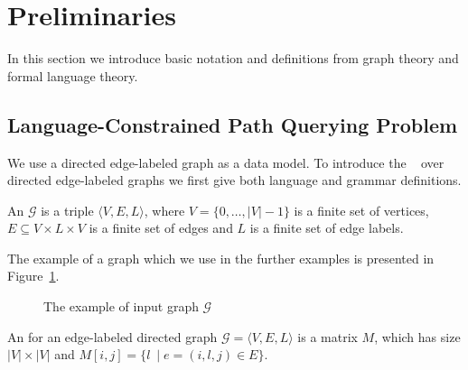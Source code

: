 \section{Preliminaries}

In this section we introduce basic notation and definitions from graph theory and formal language theory.

\subsection{Language-Constrained Path Querying Problem}

We use a directed edge-labeled graph as a data model.
To introduce the ~\cite{barrett2000formal} over directed edge-labeled graphs we first give both language and grammar definitions.

\begin{definition}
An  $\mathcal{G}$ is a triple $\langle V,E,L \rangle$, where $V = \{0, \ldots, |V|-1\}$ is a finite set of vertices, $E \subseteq V \times L \times V$ is a finite set of edges and $L$ is a finite set of edge labels.
\end{definition}

The example of a graph which we use in the further examples is presented in Figure~\ref{fig:example_input_graph}.

\begin{figure}[h]
    \centering
    \caption{The example of input graph $\mathcal{G}$}
    \label{fig:example_input_graph}
\end{figure}

\begin{definition}
An  for an edge-labeled directed graph $\mathcal{G} = \langle V,E,L \rangle$ is a matrix $M$, which has size $|V|\times|V|$ and $M[i,j] = \{l~\mid e = (i,l,j) \in E\}$.
\end{definition}

